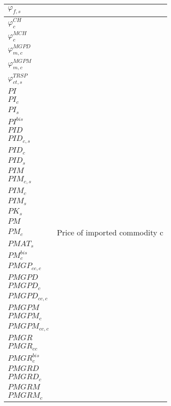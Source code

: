 \documentclass[12pt]{article}
\numberwithin{equation}{section}
\begin{document}
\begin{longtable}{@{}p{4cm}p{9cm}@{}}
 \midrule 
$\varphi_{f, s}$ &  \\
 \midrule 
$\varphi^{CH}_{c}$ &  \\
 \midrule 
$\varphi^{MCH}_{c}$ &  \\
 \midrule 
$\varphi^{MGPD}_{m, c}$ &  \\
 \midrule 
$\varphi^{MGPM}_{m, c}$ &  \\
 \midrule 
$\varphi^{TRSP}_{ct, s}$ &  \\
 \midrule 
$PI$ &  \\
 \midrule 
$PI_{c}$ &  \\
 \midrule 
$PI_{s}$ &  \\
 \midrule 
$PI^{bis}$ &  \\
 \midrule 
$PID$ &  \\
 \midrule 
$PID_{c, s}$ &  \\
 \midrule 
$PID_{c}$ &  \\
 \midrule 
$PID_{s}$ &  \\
 \midrule 
$PIM$ &  \\
 \midrule 
$PIM_{c, s}$ &  \\
 \midrule 
$PIM_{c}$ &  \\
 \midrule 
$PIM_{s}$ &  \\
 \midrule 
$PK_{s}$ &  \\
 \midrule 
$PM$ &  \\
 \midrule 
$PM_{c}$ & Price of imported commodity c \\
 \midrule 
$PMAT_{s}$ &  \\
 \midrule 
$PM^{bis}_{c}$ &  \\
 \midrule 
$PMGP_{cc, c}$ &  \\
 \midrule 
$PMGPD$ &  \\
 \midrule 
$PMGPD_{c}$ &  \\
 \midrule 
$PMGPD_{cc, c}$ &  \\
 \midrule 
$PMGPM$ &  \\
 \midrule 
$PMGPM_{c}$ &  \\
 \midrule 
$PMGPM_{cc, c}$ &  \\
 \midrule 
$PMGR$ &  \\
 \midrule 
$PMGR_{cc}$ &  \\
 \midrule 
$PMGR^{bis}_{c}$ &  \\
 \midrule 
$PMGRD$ &  \\
 \midrule 
$PMGRD_{c}$ &  \\
 \midrule 
$PMGRM$ &  \\
 \midrule 
$PMGRM_{c}$ &  \\
 \midrule 

\end{longtable}
\end{document}
